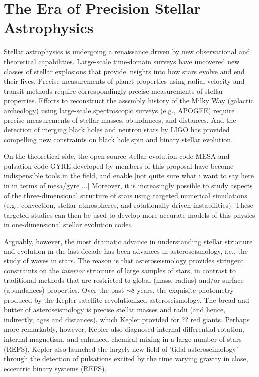 \section{The Era of Precision Stellar Astrophysics}

Stellar astrophysics is undergoing a renaissance driven by new observational and theoretical capabilities. Large-scale time-domain surveys have uncovered new classes of stellar explosions that provide insights into how stars evolve and end their lives.  Precise measurements of planet properties using radial velocity and transit methods require correspondingly precise measurements of stellar properties.  Efforts to reconstruct the assembly history of the Milky Way (galactic archeology) using large-scale spectroscopic surveys (e.g., APOGEE) require precise measurements of stellar masses, abundances, and distances.   And the detection of merging black holes and neutron stars by LIGO has provided compelling new constraints on black hole spin and binary stellar evolution.   

On the theoretical side, the open-source stellar evolution code MESA and pulsation code GYRE developed by members of this proposal have become indispensible tools in the field, and enable  [not quite sure what i want to say here in in terms of mesa/gyre ...]   Moreover, it is increasingly possible to study aspects of the three-dimensional structure of stars using targeted numerical simulations (e.g., convection, stellar atmospheres, and rotationally-driven instabilities).  These targeted studies can then be used to develop more accurate models of this physics in one-dimensional stellar evolution codes.

Arguably, however, the most dramatic advance in understanding stellar structure and evolution in the last decade has been advances in asteroseismology, i.e., the study of waves in stars.   The reason is that asteroseismology provides stringent constraints on the {\em interior} structure of large samples of stars, in contrast to traditional methods that are restricted to global (mass, radius) and/or surface (abundances) properties.   Over the past $\sim 8$ years, the exquisite photometry produced by the Kepler satellite revolutionized asteroseismology.  The bread and butter of asteroseismology is precise stellar masses and radii (and hence, indirectly, ages and distances), which Kepler provided for ?? red giants.   Perhaps more remarkably, however, Kepler also diagnosed internal differential rotation, internal magnetism, and enhanced chemical mixing in a large number of stars (REFS).  Kepler also launched the largely new field of 'tidal asteroseimology' through the detection of pulsations excited by the time varying gravity in close, eccentric binary systems (REFS). 

